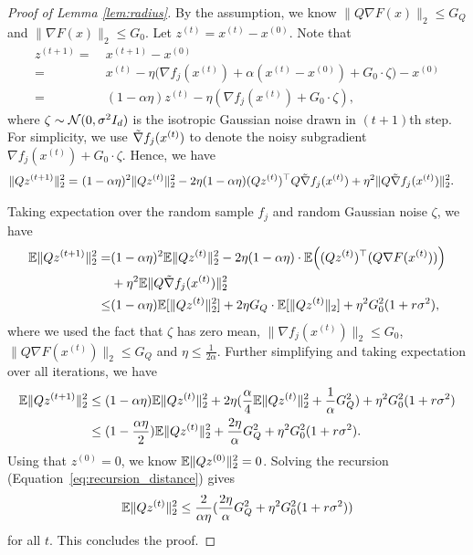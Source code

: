\begin{proof}[Proof of Lemma \ref{lem:radius}]
By the assumption, we know $\|Q \nabla F(x)\|_2\le G_Q$ and $\| \nabla F(x)\|_2\leq G_0$.
Let $z^{(t)}=x^{(t)}-x^{(0)}$. Note that
\begin{align*}
    z^{(t+1)}=& ~ x^{(t+1)}-x^{(0)}\\
    =& ~ x^{(t)}-\eta\Big(\nabla f_j(x^{(t)})+\alpha(x^{(t)}-x^{(0)})+G_{0}\cdot \zeta\Big)-x^{(0)}\\
    =& ~ (1-\alpha\eta)z^{(t)}-\eta(\nabla f_{j}(x^{(t)})+G_{0}\cdot\zeta ),
\end{align*}
where $\zeta\sim \mathcal N(0,\sigma^{2}I_d)$ is the isotropic Gaussian noise drawn in $(t+1)$th step. 
For simplicity, we use $\Tilde{\nabla} f_j(x^{(t)})$ to denote the noisy subgradient $\nabla f_{j}(x^{(t)})+G_{0}\cdot\zeta$.
Hence, we have
\begin{align*}
    \|Qz^{(t+1)}\|_2^2=& ~ (1-\alpha\eta)^2\|Qz^{(t)}\|_2^2-2\eta(1-\alpha\eta)( Qz^{(t)})^\top Q\Tilde{\nabla} f_j(x^{(t)})+\eta^2\|Q\Tilde{\nabla} f_j(x^{(t)})\|_2^2.
\end{align*}

Taking expectation over the random sample $f_j$ and random Gaussian noise $\zeta$, we have
\begin{align*}
\mathbb{E}\|Qz^{(t+1)}\|_{2}^{2}= & (1-\alpha\eta)^{2}\mathbb{E}\|Qz^{(t)}\|_{2}^{2}-2\eta(1-\alpha\eta)\cdot\mathbb{E}\Big((Qz^{(t)})^{\top}(Q\nabla F(x^{(t)}))\Big) \\
 & +\eta^{2}\mathbb{E}\|Q\Tilde{\nabla} f_j(x^{(t)})\|_{2}^{2}\\
\leq & (1-\alpha\eta)\mathbb{E}[\|Qz^{(t)}\|_{2}^{2}]+2 \eta G_{Q}\cdot\mathbb{E}[\|Qz^{(t)}\|_{2}]+\eta^{2}G_{0}^{2}(1+r\sigma^{2}),
\end{align*}
where we used the fact that $\zeta$ has zero mean, $\|\nabla f_{j}(x^{(t)})\|_{2}\leq G_{0}$, $\|Q\nabla F(x^{(t)})\|_{2}\leq G_{Q}$ and $\eta\leq\frac{1}{2\alpha}$. 
Further simplifying and taking expectation over all iterations, we have
\begin{align}
\label{eq:recursion_distance}
\mathbb{E}\|Qz^{(t+1)}\|_{2}^{2} & \leq(1-\alpha\eta)\mathbb{E}\|Qz^{(t)}\|_{2}^{2}+2\eta(\frac{\alpha}{4}\mathbb{E}\|Qz^{(t)}\|_{2}^{2}+\frac{1}{\alpha}G_{Q}^{2})+\eta^{2}G_{0}^{2}(1+r\sigma^{2}) \nonumber\\
 & \leq(1-\frac{\alpha\eta}{2})\mathbb{E}\|Qz^{(t)}\|_{2}^{2}+\frac{2 \eta}{\alpha}G_{Q}^{2}+\eta^{2}G_{0}^{2}(1+r\sigma^{2}).
\end{align}
Using that $z^{(0)}=0$, we know $\mathbb{E}\|Qz^{(0)}\|_2^2=0$.
Solving the recursion (Equation~\eqref{eq:recursion_distance}) gives 
\[
\mathbb{E}\|Qz^{(t)}\|_{2}^{2}\leq\frac{2}{\alpha\eta}(\frac{2 \eta}{\alpha}G_{Q}^{2}+\eta^{2}G_{0}^{2}(1+r\sigma^{2}))
\]
for all $t$. 
This concludes the proof.
\end{proof}


